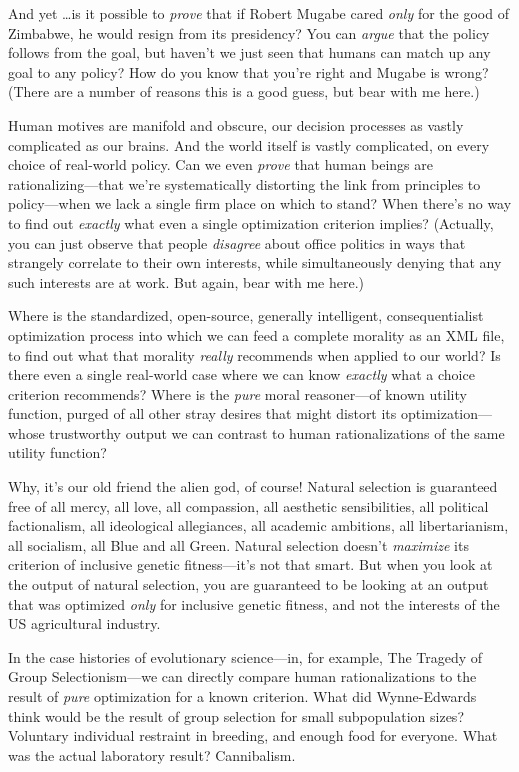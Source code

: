 {
 And yet \ldots is it possible to \textit{prove} that if Robert
Mugabe cared \textit{only} for the good of Zimbabwe, he would resign
from its presidency? You can \textit{argue} that the policy follows
from the goal, but haven't we just seen that humans can
match up any goal to any policy? How do you know that
you're right and Mugabe is wrong? (There are a number
of reasons this is a good guess, but bear with me here.)}

{
 Human motives are manifold and obscure, our decision processes as
vastly complicated as our brains. And the world itself is vastly
complicated, on every choice of real-world policy. Can we even
\textit{prove} that human beings are rationalizing---that
we're systematically distorting the link from
principles to policy---when we lack a single firm place on which to
stand? When there's no way to find out \textit{exactly}
what even a single optimization criterion implies? (Actually, you can
just observe that people \textit{disagree} about office politics in
ways that strangely correlate to their own interests, while
simultaneously denying that any such interests are at work. But again,
bear with me here.)}

{
 Where is the standardized, open-source, generally intelligent,
consequentialist optimization process into which we can feed a complete
morality as an XML file, to find out what that morality \textit{really}
recommends when applied to our world? Is there even a single real-world
case where we can know \textit{exactly} what a choice criterion
recommends? Where is the \textit{pure} moral reasoner---of known
utility function, purged of all other stray desires that might distort
its optimization---whose trustworthy output we can contrast to human
rationalizations of the same utility function?}

{
 Why, it's our old friend the alien god, of course!
Natural selection is guaranteed free of all mercy, all love, all
compassion, all aesthetic sensibilities, all political factionalism,
all ideological allegiances, all academic ambitions, all
libertarianism, all socialism, all Blue and all Green. Natural
selection doesn't \textit{maximize} its criterion of
inclusive genetic fitness---it's not that smart. But
when you look at the output of natural selection, you are guaranteed to
be looking at an output that was optimized \textit{only} for inclusive
genetic fitness, and not the interests of the US agricultural
industry.}

{
 In the case histories of evolutionary science---in, for example,
The Tragedy of Group Selectionism---we can directly compare human
rationalizations to the result of \textit{pure} optimization for a
known criterion. What did Wynne-Edwards think would be the result of
group selection for small subpopulation sizes? Voluntary individual
restraint in breeding, and enough food for everyone. What was the
actual laboratory result? Cannibalism.}

